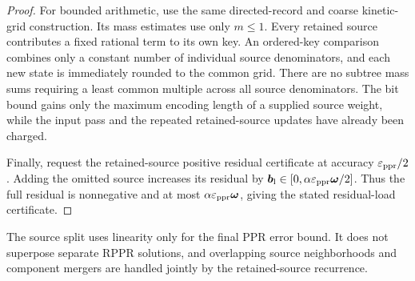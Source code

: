 \begin{proof}
For bounded arithmetic, use the same directed-record and coarse kinetic-grid
construction. Its mass estimates use only $m\leq1$.
Every retained source contributes a fixed rational term to its own key.
An ordered-key comparison combines only a constant number of individual
source denominators, and each new state is immediately rounded to the
common grid. There are no subtree mass sums requiring a least common
multiple across all source denominators. The bit bound gains only the
maximum encoding length of a supplied source weight, while the input pass
and the repeated retained-source updates have already been charged.

Finally, request the retained-source positive residual certificate at
accuracy $\varepsilon_{\mathrm{ppr}}/2$. Adding the omitted source increases its residual by
$\bm{b}_{\rm l}\in[0,\alpha\varepsilon_{\mathrm{ppr}}\bm{\omega}/2]$.
Thus the full residual is nonnegative and at most
$\alpha\varepsilon_{\mathrm{ppr}}\bm{\omega}$, giving the stated residual-load certificate.
\end{proof}

The source split uses linearity only for the final PPR error bound. It does
not superpose separate RPPR solutions, and overlapping source neighborhoods
and component mergers are handled jointly by the retained-source recurrence.
